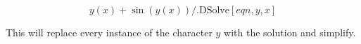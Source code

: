 \documentclass[11pt,a4paper,twoside]{article}
\begin{document}
				\[ y(x) + \sin(y(x)) /. \text{DSolve}[eqn,y,x] \]
				
				This will replace every instance of the character $y$ with the solution and simplify.
				
%		
%			
%					
%				
%					
%				
%					
%				
%					
%				
%					
%				
%					
%				
%					
%				
%					
%				
%					
%				
%					
%				
%					
%				
%					
%				
%					
%				
%					
%				
%					
%					
%					
%				
%					
%					
%					
%				
%			
			
\end{document}
